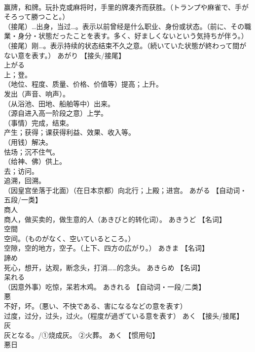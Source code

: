\documentclass[8pt]{extreport}
\begin{document}
\begin{CJK}{UTF8}{min}
\\	赢牌，和牌。玩扑克或麻将时，手里的牌凑齐而获胜。（トランプや麻雀で、手がそろって勝つこと。） 
\\	（接尾）…出身，当过…。表示以前曾经是什么职业、身份或状态。（前に、その職業・身分・状態だったことを表す。多く、好ましくないという気持ちが伴う。） 
\\	（接尾）刚…。表示持续的状态结束不久之意。（続いていた状態が終わって間がない意を表す。）	あがり		【接头/接尾】
\\	上がる	
\\	上；登。 
\\	（地位、程度、质量、价格、价值等）提高；上升。 
\\	发出（声音、响声）。 
\\	（从浴池、田地、船舶等中）出来。 
\\	（源自进入高一阶段之意）上学。 
\\	（事情）完成，结束。 
\\	产生；获得；课获得利益、效果、收入等。 
\\	（用钱）解决。 
\\	怯场；沉不住气。 
\\	（给神、佛）供上。 
\\	去；访问。 
\\	追溯，回溯。 
\\	（因皇宫坐落于北面）（在日本京都）向北行；上殿；进宫。	あがる		【自动词・五段/一类】
\\	商人	
\\	商人，做买卖的，做生意的人（あきびと的转化词）。	あきうど		【名词】
\\	空間	
\\	空间。（ものがなく、空いているところ。） 
\\	空隙，空的地方，空子。（上下、四方の広がり。）	あきま		【名词】
\\	諦め	
\\	死心，想开，达观，断念头，打消……的念头。	あきらめ		【名词】
\\	呆れる	
\\	（因意外事）吃惊，呆若木鸡。	あきれる		【自动词・一段/二类】
\\	悪	
\\	不好，坏。（悪い、不快である、害になるなどの意を表す） 
\\	过度，过分，过头，过火。（程度が過ぎている意を表す）	あく		【接头/接尾】
\\	灰	
\\	灰となる。/①烧成灰。 ②火葬。	あく		【惯用句】
\\	悪日	

\end{CJK}
\end{document}
